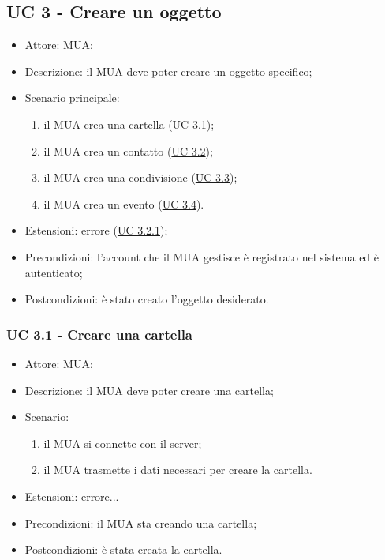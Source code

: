     \subsection{UC 3 - Creare un oggetto} \label{sec: UC 3}
    \begin{itemize}
        \item Attore: MUA;
        \item Descrizione: il MUA deve poter creare un oggetto specifico;
        \item Scenario principale:
            \begin{enumerate}
            \item il MUA crea una cartella (\hyperref[sec: UC 3.1]{UC 3.1});
            \item il MUA crea un contatto (\hyperref[sec: UC 3.2]{UC 3.2});
            \item il MUA crea una condivisione (\hyperref[sec: UC 3.3]{UC 3.3});
            \item il MUA crea un evento (\hyperref[sec: UC 3.4]{UC 3.4}).
            \end{enumerate}
        \item Estensioni: errore (\hyperref[sec: UC 3.2.1]{UC 3.2.1});
        \item Precondizioni: l’account che il MUA gestisce è registrato nel sistema ed è autenticato;
        \item Postcondizioni: è stato creato l’oggetto desiderato.
    \end{itemize}

    \subsubsection{UC 3.1 - Creare una cartella} \label{sec: UC 3.1}
    \begin{itemize}
        \item Attore: MUA;
        \item Descrizione: il MUA deve poter creare una cartella;
        \item Scenario:
            \begin{enumerate}
            \item il MUA si connette con il server;
            \item il MUA trasmette i dati necessari per creare la cartella.
            \end{enumerate}
        \item Estensioni: errore...
        \item Precondizioni: il MUA sta creando una cartella;
        \item Postcondizioni: è stata creata la cartella.
    \end{itemize}


